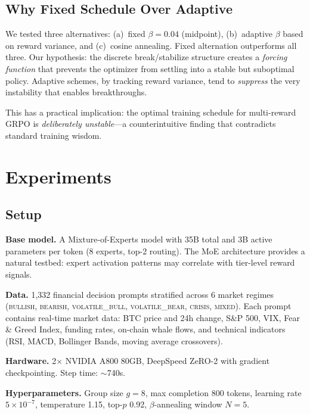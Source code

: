 \documentclass[sigconf]{acmart}
\begin{document}
\subsection{Why Fixed Schedule Over Adaptive}

We tested three alternatives: (a)~fixed $\beta = 0.04$ (midpoint), (b)~adaptive $\beta$ based on reward variance, and (c)~cosine annealing. Fixed alternation outperforms all three. Our hypothesis: the discrete break/stabilize structure creates a \textit{forcing function} that prevents the optimizer from settling into a stable but suboptimal policy. Adaptive schemes, by tracking reward variance, tend to \textit{suppress} the very instability that enables breakthroughs.

This has a practical implication: the optimal training schedule for multi-reward GRPO is \textit{deliberately unstable}---a counterintuitive finding that contradicts standard training wisdom.

\section{Experiments}
\label{sec:experiments}

\subsection{Setup}

\textbf{Base model.} A Mixture-of-Experts model with 35B total and 3B active parameters per token (8 experts, top-2 routing). The MoE architecture provides a natural testbed: expert activation patterns may correlate with tier-level reward signals.

\textbf{Data.} 1{,}332 financial decision prompts stratified across 6 market regimes (\textsc{bullish}, \textsc{bearish}, \textsc{volatile\_bull}, \textsc{volatile\_bear}, \textsc{crisis}, \textsc{mixed}). Each prompt contains real-time market data: BTC price and 24h change, S\&P 500, VIX, Fear \& Greed Index, funding rates, on-chain whale flows, and technical indicators (RSI, MACD, Bollinger Bands, moving average crossovers).

\textbf{Hardware.} 2$\times$ NVIDIA A800 80GB, DeepSpeed ZeRO-2 with gradient checkpointing. Step time: $\sim$740s.

\textbf{Hyperparameters.} Group size $g = 8$, max completion 800 tokens, learning rate $5 \times 10^{-7}$, temperature 1.15, top-$p$ 0.92, $\beta$-annealing window $N = 5$.
\end{document}

